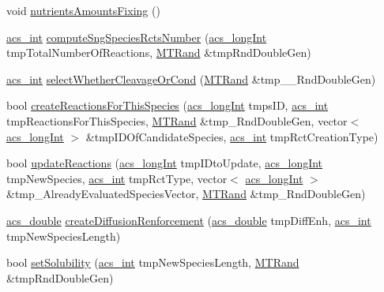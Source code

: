 \begin{DoxyCompactItemize}
\item 
void \hyperlink{a00013_a9ceec5e00b0f5a51dd125c583b8ac5ec}{nutrients\+Amounts\+Fixing} ()
\item 
\hyperlink{a00050_a8d277355641a098190360234e2ebde35}{acs\+\_\+int} \hyperlink{a00013_a0fd3cb062d35d2f6dd8961e95dd477b7}{compute\+Sng\+Species\+Rcts\+Number} (\hyperlink{a00050_a19319d75f02db4308bc5c0026d98cd85}{acs\+\_\+long\+Int} tmp\+Total\+Number\+Of\+Reactions, \hyperlink{a00015}{M\+T\+Rand} \&tmp\+Rnd\+Double\+Gen)
\item 
\hyperlink{a00050_a8d277355641a098190360234e2ebde35}{acs\+\_\+int} \hyperlink{a00013_a53282cca8882e86652ab0a22e6966d17}{select\+Whether\+Cleavage\+Or\+Cond} (\hyperlink{a00015}{M\+T\+Rand} \&tmp\+\_\+\+\_\+\+Rnd\+Double\+Gen)
\item 
bool \hyperlink{a00013_a76794f37d6d94b7504c58f0f4a4709ca}{create\+Reactions\+For\+This\+Species} (\hyperlink{a00050_a19319d75f02db4308bc5c0026d98cd85}{acs\+\_\+long\+Int} tmps\+I\+D, \hyperlink{a00050_a8d277355641a098190360234e2ebde35}{acs\+\_\+int} tmp\+Reactions\+For\+This\+Species, \hyperlink{a00015}{M\+T\+Rand} \&tmp\+\_\+\+Rnd\+Double\+Gen, vector$<$ \hyperlink{a00050_a19319d75f02db4308bc5c0026d98cd85}{acs\+\_\+long\+Int} $>$ \&tmp\+I\+D\+Of\+Candidate\+Species, \hyperlink{a00050_a8d277355641a098190360234e2ebde35}{acs\+\_\+int} tmp\+Rct\+Creation\+Type)
\item 
bool \hyperlink{a00013_ace92235425bfbe692e3873ba5bb07639}{update\+Reactions} (\hyperlink{a00050_a19319d75f02db4308bc5c0026d98cd85}{acs\+\_\+long\+Int} tmp\+I\+Dto\+Update, \hyperlink{a00050_a19319d75f02db4308bc5c0026d98cd85}{acs\+\_\+long\+Int} tmp\+New\+Species, \hyperlink{a00050_a8d277355641a098190360234e2ebde35}{acs\+\_\+int} tmp\+Rct\+Type, vector$<$ \hyperlink{a00050_a19319d75f02db4308bc5c0026d98cd85}{acs\+\_\+long\+Int} $>$ \&tmp\+\_\+\+Already\+Evaluated\+Species\+Vector, \hyperlink{a00015}{M\+T\+Rand} \&tmp\+\_\+\+Rnd\+Double\+Gen)
\item 
\hyperlink{a00050_ab776853a005fcbf56af0424a2a4dd607}{acs\+\_\+double} \hyperlink{a00013_af795a4d1f04dfbfcbdf321e20e74f9c2}{create\+Diffusion\+Renforcement} (\hyperlink{a00050_ab776853a005fcbf56af0424a2a4dd607}{acs\+\_\+double} tmp\+Diff\+Enh, \hyperlink{a00050_a8d277355641a098190360234e2ebde35}{acs\+\_\+int} tmp\+New\+Species\+Length)
\item 
bool \hyperlink{a00013_a496ba50d3a345cd842ce42406946405c}{set\+Solubility} (\hyperlink{a00050_a8d277355641a098190360234e2ebde35}{acs\+\_\+int} tmp\+New\+Species\+Length, \hyperlink{a00015}{M\+T\+Rand} \&tmp\+Rnd\+Double\+Gen)

\end{DoxyCompactItemize}

